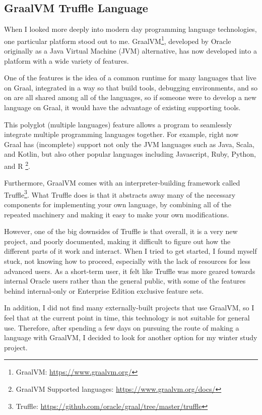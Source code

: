 \documentclass[tikz]{article}
\renewcommand{\:}{\colon}
\begin{document}
\subsection*{GraalVM Truffle Language}
When I looked more deeply into modern day programming language technologies, one particular platform stood out to me. GraalVM\footnote{GraalVM: \url{https://www.graalvm.org/}}, developed by Oracle originally as a Java Virtual Machine (JVM) alternative, has now developed into a platform with a wide variety of features.

One of the features is the idea of a common runtime for many languages that live on Graal, integrated in a way so that build tools, debugging environments, and so on are all shared among all of the languages, so if someone were to develop a new language on Graal, it would have the advantage of existing supporting tools. 

This polyglot (multiple languages) feature allows a program to seamlessly integrate multiple programming languages together. For example, right now Graal has (incomplete) support not only the JVM languages such as Java, Scala, and Kotlin, but also other popular languages including Javascript, Ruby, Python, and R \footnote{GraalVM Supported languages: \url{https://www.graalvm.org/docs/}}.

Furthermore, GraalVM comes with an interpreter-building framework called Truffle\footnote{Truffle: \url{https://github.com/oracle/graal/tree/master/truffle}}. What Truffle does is that it abstracts away many of the necessary components for implementing your own language, by combining all of the repeated machinery and making it easy to make your own modifications.

However, one of the big downsides of Truffle is that overall, it is a very new project, and poorly documented, making it difficult to figure out how the different parts of it work and interact. When I tried to get started, I found myself stuck, not knowing how to proceed, especially with the lack of resources for less advanced users. As a short-term user, it felt like Truffle was more geared towards internal Oracle users rather than the general public, with some of the features behind internal-only or Enterprise Edition exclusive feature sets.

In addition, I did not find many externally-built projects that use GraalVM, so I feel that at the current point in time, this technology is not suitable for general use. Therefore, after spending a few days on pursuing the route of making a language with GraalVM, I decided to look for another option for my winter study project.
\end{document}
